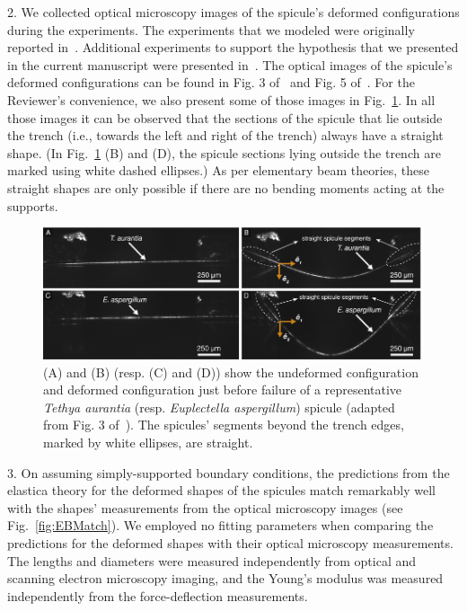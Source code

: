\documentclass[11pt,letterpaper]{report}
\begin{document}
\begin{enumerate}[label=\textit{1.\arabic*},wide, labelwidth=!, labelindent=0pt]
2. We collected optical microscopy images of the spicule's deformed configurations during the experiments. The experiments that we modeled were originally reported in~\citet{monn2017enhanced}. Additional experiments to support the hypothesis that we presented in the current manuscript were presented in~\citet{kochiyama2021sawtooth}. The optical images of the spicule's deformed configurations can be found in  Fig. 3 of~\citet{monn2017enhanced} and Fig. 5 of~\citet{kochiyama2021sawtooth}. For the Reviewer's convenience, we also present some of those images in Fig.~\ref{fig:photos}. In all those images it can be observed that the
sections of the spicule that lie outside the trench (i.e., towards the left and right  of the trench) always have a straight shape. (In Fig.~\ref{fig:photos} (B) and (D), the spicule sections lying outside the trench are marked using  white dashed ellipses.) As per elementary beam theories, these straight shapes are only possible if there are no bending moments acting at the supports.




\begin{figure}[H]
\centering
\includegraphics[width = 1.0\textwidth]{Figures/Straight.pdf}
\caption{(A) and (B) (resp. (C) and (D)) show the undeformed configuration and deformed configuration just before failure of a representative \textit{Tethya aurantia} (resp. \textit{Euplectella aspergillum}) spicule (adapted from Fig. 3 of~\citet{monn2017enhanced}). The spicules' segments beyond the trench edges, marked by white ellipses, are straight.}
\label{fig:photos}
\end{figure}


3. On assuming simply-supported boundary conditions, the predictions from the  elastica  theory for the deformed shapes of the spicules match remarkably well with the shapes' measurements  from the optical microscopy images (see Fig.~\ref{fig:EBMatch}).  We employed no  fitting parameters when comparing the predictions for the deformed shapes with their optical microscopy measurements. The lengths and diameters were measured independently from optical and scanning electron microscopy imaging, and the Young's modulus was measured independently from the force-deflection measurements.


\end{enumerate}
\end{document}
